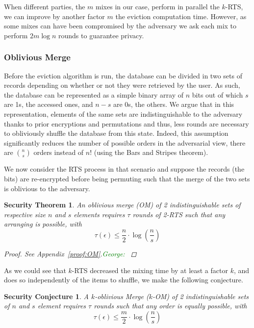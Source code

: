 \documentclass[USenglish,oneside,twocolumn]{article}
\newtheorem{secthm}{Security Theorem}
\newtheorem{seccjt}{Security Conjecture}
\newcommand{\george}[1]{\textcolor{green}{George: #1}}
\begin{document}
When different parties, the $m$ mixes in our case, perform in parallel the $k$-RTS, we can improve by another factor $m$ the eviction computation time. However, as some mixes can have been compromised by the adversary we ask each mix to perform $2 m\log n$ rounds to guarantee privacy.
%
\subsubsection{Oblivious Merge}\label{OM}
Before the eviction algorithm is run, the database can be divided in two sets of records depending on whether or not they were retrieved by the user. As such, the database can be represented as a simple binary array of $n$ bits out of which $s$ are 1s, the accessed ones, and $n-s$ are 0s, the others.
We argue that in this representation, elements of the same sets are indistinguishable to the adversary thanks to prior encryptions and permutations and thus, less rounds are necessary to obliviously shuffle the database from this state. Indeed, this assumption significantly reduces the number of possible orders in the adversarial view, there are  ${n \choose s}$ orders instead of $n!$ (using the Bars and Stripes theorem).

We now consider the RTS process in that scenario and suppose the records (the bits) are re-encrypted before being permuting such that the merge of the two sets is oblivious to the adversary.

\begin{secthm}
An oblivious merge (OM) of 2 indistinguishable sets of respective size $n$ and $s$ elements requires $\tau$ rounds of 2-RTS such that any arranging is possible, with
$$\tau(\epsilon) \leq \frac{n}{2}  \cdot \log \left (\frac{n}{s}\right)$$%
\begin{proof}
See Appendix~\ref{proof:OM}.\george{}
\end{proof}
\end{secthm}

As we could see that $k$-RTS decreased the mixing time by at least a factor $k$, and does so independently of the items to shuffle, we make the following conjecture.

\begin{seccjt}\label{sec:kOM}
A $k$-oblivious Merge ($k$-OM) of 2 indistinguishable sets of $n$ and $s$ element requires $\tau$ rounds such that any order is equally possible, with
$$ \tau(\epsilon) \leq \frac{m}{2}  \cdot \log \left (\frac{n}{s}\right) $$
\end{seccjt}
%
\end{document}
